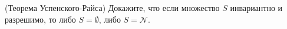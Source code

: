 (Теорема Успенского-Райса) Докажите, что если множество $S$ инвариантно и разрешимо, то либо $S = \emptyset$, либо $S = \mathcal{N}$.